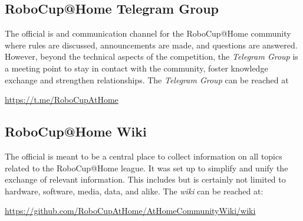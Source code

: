 \subsection{RoboCup@Home Telegram Group}
The official  is and communication channel for the RoboCup@Home community where rules are discussed, announcements are made, and questions are answered.
However, beyond the technical aspects of the competition, the \textit{Telegram Group} is a meeting point to stay in contact with the community, foster knowledge exchange and strengthen relationships.
The \textit{Telegram Group} can be reached at
\begin{center}
{\small\url{https://t.me/RoboCupAtHome}}
\end{center}

\subsection{RoboCup@Home Wiki}
\label{sec:at_home_wiki}
The official  is meant to be a central place to collect information on all topics related to the RoboCup@Home league. It was set up to simplify and unify the exchange of relevant information.
This includes but is certainly not limited to hardware, software, media, data, and alike.
The \textit{wiki} can be reached at:
\begin{center}
{\small\url{https://github.com/RoboCupAtHome/AtHomeCommunityWiki/wiki}}
\end{center}

